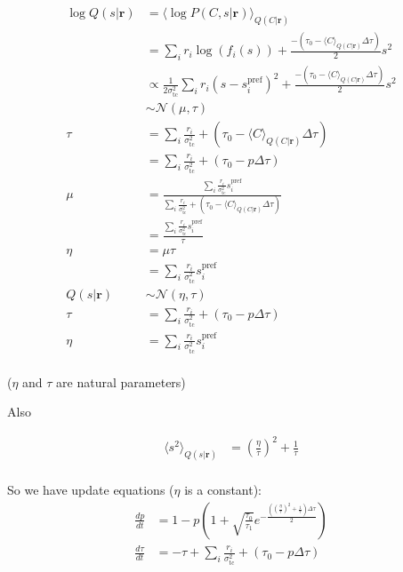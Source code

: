 \documentclass[12pt]{article}
\begin{document}
\begin{equation}
\begin{aligned}
\log Q(s|\mathbf{r}) &= \langle \log P(C, s|\mathbf{r}) \rangle_{Q(C|\mathbf{r})}\\
&= \sum_i r_i \log(f_i(s)) + \frac{- (\tau_0 - \langle C \rangle_{Q(C|\mathbf{r})} \Delta \tau)}{2} s^2\\
&\propto \frac{1}{2 \sigma^2_{\text{tc}}} \sum_i r_i (s - s_i^{\text{pref}})^2 + \frac{- (\tau_0 - \langle C \rangle_{Q(C|\mathbf{r})} \Delta \tau)}{2} s^2\\
&\sim \mathcal{N} (\mu, \tau)\\
\tau &= \sum_i \frac{r_i}{\sigma^2_{\text{tc}}}+ (\tau_0 - \langle C \rangle_{Q(C|\mathbf{r})} \Delta \tau)\\
&= \sum_i \frac{r_i}{\sigma^2_{\text{tc}}}+ (\tau_0 - p \Delta \tau)\\
\mu &= \frac{\sum_i \frac{r_i}{\sigma^2_{\text{tc}}}s_i^{\text{pref}}}{\sum_i \frac{r_i}{\sigma^2_{\text{tc}}}+ (\tau_0 - \langle C \rangle_{Q(C|\mathbf{r})} \Delta \tau)}\\
&= \frac{\sum_i \frac{r_i}{\sigma^2_{\text{tc}}}s_i^{\text{pref}}}{\tau}\\
\eta &= \mu \tau\\
&= \sum_i \frac{r_i}{\sigma^2_{\text{tc}}}s_i^{\text{pref}}\\
Q(s|\mathbf{r}) &\sim \mathcal{N} (\eta, \tau)\\
\tau &= \sum_i \frac{r_i}{\sigma^2_{\text{tc}}}+ (\tau_0 - p \Delta \tau)\\
\eta &= \sum_i \frac{r_i}{\sigma^2_{\text{tc}}}s_i^{\text{pref}}\\
\end{aligned}
\end{equation}

($\eta$ and $\tau$ are natural parameters)

Also

\begin{equation}
\begin{aligned}
\langle s^2 \rangle_{Q(s|\mathbf{r})} &= (\frac{\eta}{\tau})^2 + \frac{1}{\tau}\\
\end{aligned}
\end{equation}

So we have update equations ($\eta$ is a constant):
\begin{equation}
\begin{aligned}
\frac{dp}{dt} &= 1 - p(1 + \sqrt{\frac{\tau_0}{\tau_1}} e^{-\frac{((\frac{\eta}{\tau})^2 + \frac{1}{\tau}) \Delta \tau}{2}})\\
\frac{d \tau}{dt} &= -\tau + \sum_i \frac{r_i}{\sigma^2_{\text{tc}}}+ (\tau_0 - p \Delta \tau)\\
\end{aligned}
\end{equation}
\end{document}
